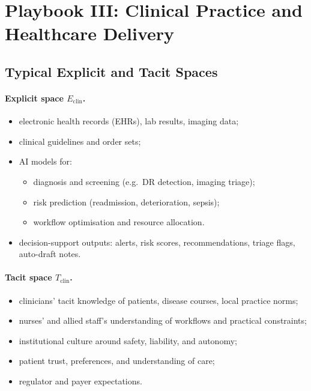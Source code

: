 \section{Playbook III: Clinical Practice and Healthcare Delivery}
\label{sec:playbook-clinical}

\subsection{Typical Explicit and Tacit Spaces}

\paragraph{Explicit space \(E_{\mathrm{clin}}\).}

\begin{itemize}
  \item electronic health records (EHRs), lab results, imaging data;
  \item clinical guidelines and order sets;
  \item AI models for:
        \begin{itemize}
          \item diagnosis and screening (e.g.\ DR detection, imaging
                triage);
          \item risk prediction (readmission, deterioration, sepsis);
          \item workflow optimisation and resource allocation.
        \end{itemize}
  \item decision-support outputs:
        alerts, risk scores, recommendations, triage flags, auto-draft
        notes.
\end{itemize}

\paragraph{Tacit space \(T_{\mathrm{clin}}\).}

\begin{itemize}
  \item clinicians' tacit knowledge of patients, disease courses,
        local practice norms;
  \item nurses’ and allied staff’s understanding of workflows and
        practical constraints;
  \item institutional culture around safety, liability, and autonomy;
  \item patient trust, preferences, and understanding of care;
  \item regulator and payer expectations.
\end{itemize}


